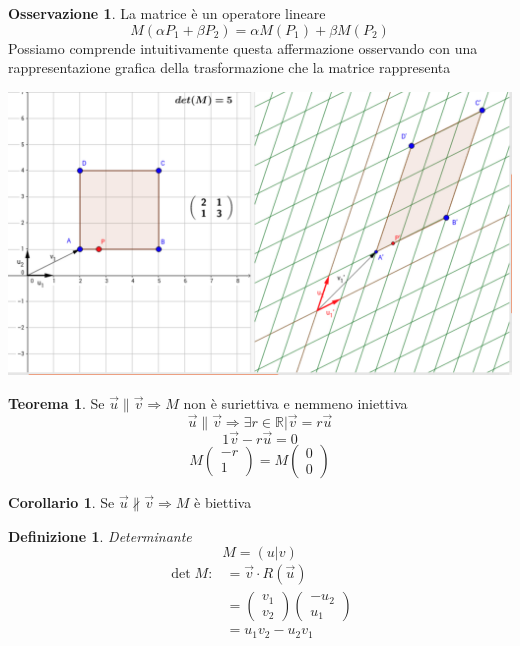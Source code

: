 \documentclass[10pt,a4paper]{article}
\theoremstyle{plain}
\newtheorem{definizione}[subsection]{Definizione}
\theoremstyle{definition}
\newtheorem{teorema}[subsection]{Teorema}
\newtheorem{corollario}[subsection]{Corollario}
\newtheorem{osservazione}[subsection]{Osservazione}
\begin{document}
	\begin{osservazione}La matrice è un operatore lineare
		\[
		M(\alpha P_1 + \beta P_2)= \alpha M(P_1) + \beta M(P_2)
		\]
	Possiamo comprende intuitivamente questa affermazione osservando con una rappresentazione grafica della trasformazione che la matrice rappresenta\\
	
	\begin{center}
		\includegraphics[scale=0.2]{matrix.png}
	\end{center}
	\end{osservazione}
	\begin{teorema}Se $\vec{u}\parallel\vec{v} \Rightarrow M$ non è suriettiva e nemmeno iniettiva \\
		\[
		\vec{u} \parallel \vec{v} \Rightarrow \exists r \in \mathbb{R} \vert	\vec{v}=r\vec{u}
		\]
		\[1\vec{v} - r\vec{u}=0\]
		\[
		M \begin{pmatrix}
			-r \\
			1
		\end{pmatrix}
		=
		M \begin{pmatrix}
			0 \\
			0
		\end{pmatrix}
		\]
	\end{teorema}
	\begin{corollario}
		Se $\vec{u}\nparallel\vec{v}\Rightarrow M$ è biettiva
	\end{corollario}
	\begin{definizione}
		Determinante \\
		\[
		M=(u\vert v)
		\]
		\begin{align*}
			\det{M}:&=\vec{v}\cdot R(\vec{u}) \\
			&=\begin{pmatrix}
			v_1 \\ v_2
			\end{pmatrix}
			\begin{pmatrix}
				-u_2 \\ u_1
			\end{pmatrix} \\
			&=u_1 v_2 - u_2 v_1
		\end{align*}
	\end{definizione}
\end{document}
